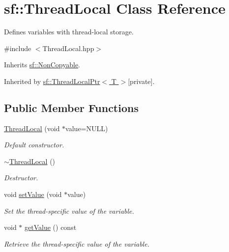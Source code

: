 \hypertarget{classsf_1_1_thread_local}{\section{sf\+:\+:Thread\+Local Class Reference}
\label{classsf_1_1_thread_local}
}


Defines variables with thread-\/local storage.  




{\ttfamily \#include $<$Thread\+Local.\+hpp$>$}



Inherits \hyperlink{classsf_1_1_non_copyable}{sf\+::\+Non\+Copyable}.



Inherited by \hyperlink{classsf_1_1_thread_local_ptr}{sf\+::\+Thread\+Local\+Ptr$<$ T $>$}{\ttfamily  \mbox{[}private\mbox{]}}.

\subsection*{Public Member Functions}
\begin{DoxyCompactItemize}
\item 
\hyperlink{classsf_1_1_thread_local_a44ea3c4be4eef118080275cbf4cf04cd}{Thread\+Local} (void $\ast$value=N\+U\+L\+L)
\begin{DoxyCompactList}\small\item\em Default constructor. \end{DoxyCompactList}\item 
\hypertarget{classsf_1_1_thread_local_acc612bddfd0f0507b1c5da8b3b8c75c2}{\hyperlink{classsf_1_1_thread_local_acc612bddfd0f0507b1c5da8b3b8c75c2}{$\sim$\+Thread\+Local} ()}\label{classsf_1_1_thread_local_acc612bddfd0f0507b1c5da8b3b8c75c2}

\begin{DoxyCompactList}\small\item\em Destructor. \end{DoxyCompactList}\item 
void \hyperlink{classsf_1_1_thread_local_ab7e334c83d77644a8e67ee31c3230007}{set\+Value} (void $\ast$value)
\begin{DoxyCompactList}\small\item\em Set the thread-\/specific value of the variable. \end{DoxyCompactList}\item 
void $\ast$ \hyperlink{classsf_1_1_thread_local_aef35a39686eac4b6634a6e5605aacfd7}{get\+Value} () const 
\begin{DoxyCompactList}\small\item\em Retrieve the thread-\/specific value of the variable. \end{DoxyCompactList}\end{DoxyCompactItemize}


